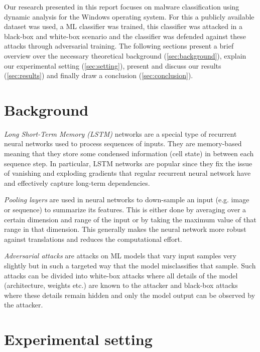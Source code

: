 \documentclass[final]{cvpr}
\begin{document}
Our research presented in this report focuses on malware classification using 
dynamic analysis for the Windows operating system. For this a publicly 
available dataset was used, a ML 
classifier was trained, this classifier was attacked in a black-box and 
white-box scenario and the classifier was defended against these attacks 
through adversarial training. The following sections present a brief overview 
over the necessary theoretical background (\autoref{sec:background}), explain 
our experimental setting (\autoref{sec:setting}), 
present and discuss our results (\autoref{sec:results}) and finally draw a 
conclusion (\autoref{sec:conclusion}).
\section{Background}
\label{sec:background}
\textit{Long Short-Term Memory (LSTM)} networks are a special type of recurrent 
neural networks used to process sequences of inputs. They are memory-based 
meaning that they store some condensed information (cell state) in between each 
sequence step. In particular, LSTM networks are popular since they fix the 
issue of vanishing and exploding gradients that regular recurrent neural 
network have and effectively capture long-term dependencies. 
\autocite[3]{agrawal2018robust} \autocite[1]{DBLP:journals/corr/GreffSKSS15}

\textit{Pooling layers} are used in neural networks to down-sample an input 
(e.g. image or sequence) to summarize its features. This is either done by 
averaging over a certain dimension and range of the input or by taking the 
maximum value of that range in that dimension. This generally makes the neural 
network more robust against translations and reduces the computational effort. 
\autocite{pooling19}

\textit{Adversarial attacks} are attacks on ML models that vary input samples 
very slightly but in such a targeted way that the model misclassifies that 
sample. Such attacks can be divided into white-box attacks where all details of 
the model (architecture, weights etc.) are known to the attacker and black-box 
attacks where these details remain hidden and only the model output can be 
observed by the attacker. \autocite[186]{voynov20}


\section{Experimental setting}
\label{sec:setting}
\end{document}
